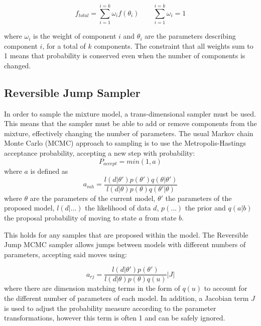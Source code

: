 \documentclass[11pt]{article} %
\begin{document}
\begin{equation}\label{eq:mm}
f_{total} = \sum_{i=1}^{i=k}\omega_{i}f(\theta_{i}) \qquad \sum_{i=1}^{i=k}\omega_{i} = 1
\end{equation}

where $\omega_{i}$ is the weight of component $i$ and $\theta_{i}$ are the parameters describing component $i$, for a total of $k$ components. The constraint that all weights sum to 1 means that probability is conserved even when the number of components is changed.

\subsection{Reversible Jump Sampler}
In order to sample the mixture model, a trans-dimensional sampler must be used. This means that the sampler must be able to add or remove components from the mixture, effectively changing the number of parameters. 
The usual Markov chain Monte Carlo (MCMC) approach to sampling is to use the Metropolis-Hastings acceptance probability, accepting a new step with probability:
\begin{equation}
P_{accept} = min(1,a)
\end{equation}
where $a$ is defined as
\begin{equation}
a_{mh} = \frac{l(d|\theta')p(\theta')q(\theta|\theta')}{ l(d|\theta)p(\theta)q(\theta'|\theta)}
\end{equation}
where $\theta$ are the parameters of the current model, $\theta'$ the parameters of the proposed model, $l(d|...)$ the likelihood of data $d$, $p(...)$ the prior and $q(a|b)$ the proposal probability of moving to state $a$ from state $b$.

This holds for any samples that are proposed within the model. The Reversible Jump MCMC sampler allows jumps between models with different numbers of parameters, accepting said moves using:

\begin{equation}\label{eq:rj_a}
a_{rj} = \frac{l(d|\theta')p(\theta')}{l(d|\theta)p(\theta)q(u)}|J|
\end{equation}
where there are dimension matching terms in the form of $q(u)$ to account for the different number of parameters of each model. In addition, a Jacobian term $J$ is used to adjust the probability measure according to the parameter transformations, however this term is often 1 and can be safely ignored.
\end{document}
